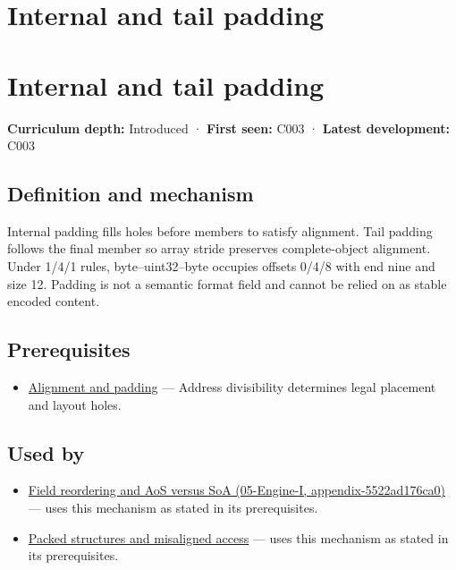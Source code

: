 \hypertarget{appendix-f52f8c5a3afd}{}
\section*{Internal and tail padding}
\section{Internal and tail padding}\label{internal-and-tail-padding}

\textbf{Curriculum depth:} Introduced · \textbf{First seen:} C003 · \textbf{Latest development:} C003

\subsection{Definition and mechanism}\label{definition-and-mechanism}

Internal padding fills holes before members to satisfy alignment. Tail padding follows the final member so array stride preserves complete-object alignment. Under 1/4/1 rules, byte--uint32--byte occupies offsets 0/4/8 with end nine and size 12. Padding is not a semantic format field and cannot be relied on as stable encoded content.

\subsection{Prerequisites}\label{prerequisites}

\begin{itemize}
\tightlist
\item
  \hyperref[appendix-a1f7c53b4742]{Alignment and padding} --- Address divisibility determines legal placement and layout holes.
\end{itemize}

\subsection{Used by}\label{used-by}

\begin{itemize}
\tightlist
\item
  \href{}{Field reordering and AoS versus SoA (05-Engine-I, appendix-5522ad176ca0)} --- uses this mechanism as stated in its prerequisites.
\item
  \hyperref[appendix-0682dbfc5f0e]{Packed structures and misaligned access} --- uses this mechanism as stated in its prerequisites.
\end{itemize}

